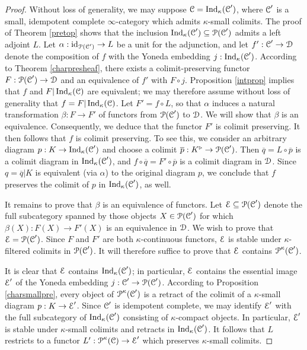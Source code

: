 \begin{proof}
Without loss of generality, we may suppose $\operatorname{\mathcal{C}} = \operatorname{Ind}_{\kappa}( \operatorname{\mathcal{C}}')$, where $\operatorname{\mathcal{C}}'$ is a small, idempotent complete $\infty$-category which admits $\kappa$-small colimits. The proof of Theorem \ref{pretop} shows that the inclusion $\operatorname{Ind}_{\kappa}(\operatorname{\mathcal{C}}') \subseteq \operatorname{\mathcal{P}}(\operatorname{\mathcal{C}}')$ admits a left adjoint $L$.
Let $\alpha: \operatorname{id}_{\operatorname{\mathcal{P}}(\operatorname{\mathcal{C}}')} \rightarrow L$ be a unit for the adjunction, and let
$f': \operatorname{\mathcal{C}}' \rightarrow \operatorname{\mathcal{D}}$ denote the composition of $f$ with the Yoneda embedding
$j: \operatorname{Ind}_{\kappa}(\operatorname{\mathcal{C}}')$. According to Theorem \ref{charpresheaf}, there exists a
colimit-preserving functor $F: \operatorname{\mathcal{P}}(\operatorname{\mathcal{C}}') \rightarrow \operatorname{\mathcal{D}}$ and an equivalence
of $f'$ with $F \circ j$. Proposition \ref{intprop} implies that $f$ and $F| \operatorname{Ind}_{\kappa}(\operatorname{\mathcal{C}})$
are equivalent; we may therefore assume without loss of generality that $f = F | \operatorname{Ind}_{\kappa}(\operatorname{\mathcal{C}})$. Let $F' = f \circ L$, so that $\alpha$ induces a natural transformation 
$\beta: F \rightarrow F'$ of functors from $\operatorname{\mathcal{P}}(\operatorname{\mathcal{C}}')$ to $\operatorname{\mathcal{D}}$. We will show that
$\beta$ is an equivalence. Consequently, we deduce that the functor $F'$ is colimit preserving. 
It then follows that $f$ is colimit preserving. To see this, we consider an arbitrary diagram
$p: K \rightarrow \operatorname{Ind}_{\kappa}(\operatorname{\mathcal{C}}')$ and choose a colimit $\overline{p}: K^{\triangleright} \rightarrow \operatorname{\mathcal{P}}(\operatorname{\mathcal{C}}')$. Then $\overline{q} = L \circ \overline{p}$ is a colimit diagram in $\operatorname{Ind}_{\kappa}(\operatorname{\mathcal{C}}')$, and $f \circ \overline{q} = F' \circ \overline{p}$ is a colimit diagram in $\operatorname{\mathcal{D}}$. Since $q = \overline{q} | K$ is equivalent (via $\alpha$) to the original diagram $p$, we conclude that $f$ preserves the colimit of $p$ in $\operatorname{Ind}_{\kappa}(\operatorname{\mathcal{C}}')$, as well.

It remains to prove that $\beta$ is an equivalence of functors. Let $\operatorname{\mathcal{E}} \subseteq \operatorname{\mathcal{P}}(\operatorname{\mathcal{C}}')$ denote the full subcategory spanned by those objects $X \in \operatorname{\mathcal{P}}(\operatorname{\mathcal{C}}')$ for which
$\beta(X): F(X) \rightarrow F'(X)$ is an equivalence in $\operatorname{\mathcal{D}}$. We wish to prove that
$\operatorname{\mathcal{E}} = \operatorname{\mathcal{P}}(\operatorname{\mathcal{C}}')$. Since $F$ and $F'$
are both $\kappa$-continuous functors, $\operatorname{\mathcal{E}}$ is stable under $\kappa$-filtered colimits
in $\operatorname{\mathcal{P}}(\operatorname{\mathcal{C}}')$. It will therefore suffice to prove that $\operatorname{\mathcal{E}}$ contains $\operatorname{\mathcal{P}}^{\kappa}(\operatorname{\mathcal{C}}')$. 

It is clear that $\operatorname{\mathcal{E}}$ contains $\operatorname{Ind}_{\kappa}(\operatorname{\mathcal{C}}')$; in particular, $\operatorname{\mathcal{E}}$ contains
the essential image $\operatorname{\mathcal{E}}'$ of the Yoneda embedding $j: \operatorname{\mathcal{C}}' \rightarrow \operatorname{\mathcal{P}}(\operatorname{\mathcal{C}}')$. 
According to Proposition \ref{charsmallpre}, every object of $\operatorname{\mathcal{P}}^{\kappa}(\operatorname{\mathcal{C}}')$ is a retract of the colimit of a $\kappa$-small diagram $p: K \rightarrow \operatorname{\mathcal{E}}'$. Since $\operatorname{\mathcal{C}}'$ is idempotent complete, we may identify $\operatorname{\mathcal{E}}'$ with the full subcategory of $\operatorname{Ind}_{\kappa}(\operatorname{\mathcal{C}}')$ consisting of $\kappa$-compact objects. In particular, $\operatorname{\mathcal{E}}'$ is stable under $\kappa$-small colimits and retracts in $\operatorname{Ind}_{\kappa}(\operatorname{\mathcal{C}}')$. It follows that $L$ restricts to a functor $L': \operatorname{\mathcal{P}}^{\kappa}(\operatorname{\mathcal{C}}) \rightarrow \operatorname{\mathcal{E}}'$
which preserves $\kappa$-small colimits.


\end{proof}
